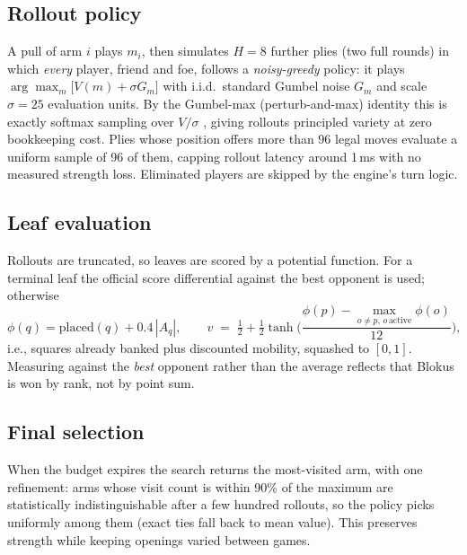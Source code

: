\documentclass[11pt]{article}
\begin{document}
\subsection{Rollout policy}

A pull of arm $i$ plays $m_i$, then simulates $H=8$ further plies (two full
rounds) in which \emph{every} player, friend and foe, follows a
\emph{noisy-greedy} policy: it plays
$\arg\max_m \big[V(m) + \sigma G_m\big]$ with i.i.d.\ standard Gumbel noise
$G_m$ and scale $\sigma=25$ evaluation units. By the Gumbel-max
(perturb-and-max) identity this is exactly softmax sampling over $V/\sigma$
\cite{gumbel1954,maddison2014}, giving rollouts principled variety at zero
bookkeeping cost. Plies whose position offers more than 96 legal moves
evaluate a uniform sample of 96 of them, capping rollout latency around
1\,ms with no measured strength loss. Eliminated players are skipped by the
engine's turn logic.

\subsection{Leaf evaluation}

Rollouts are truncated, so leaves are scored by a potential function. For a
terminal leaf the official score differential against the best opponent is
used; otherwise
\begin{equation}
\phi(q) = \mathrm{placed}(q) + 0.4\,|A_q|, \qquad
v \;=\; \tfrac12 + \tfrac12\tanh\!\Big(\frac{\phi(p)-\max_{o\neq p,\,o\,\text{active}}\phi(o)}{12}\Big),
\end{equation}
i.e., squares already banked plus discounted mobility, squashed to $[0,1]$.
Measuring against the \emph{best} opponent rather than the average reflects
that Blokus is won by rank, not by point sum.

\subsection{Final selection}

When the budget expires the search returns the most-visited arm, with one
refinement: arms whose visit count is within 90\% of the maximum are
statistically indistinguishable after a few hundred rollouts, so the policy
picks uniformly among them (exact ties fall back to mean value). This
preserves strength while keeping openings varied between games.
\end{document}

